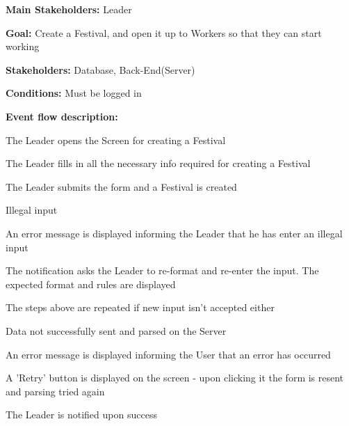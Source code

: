 				\noindent {}
				\begin{packed_item}
					\item \textbf{Main Stakeholders:} Leader
					\item \textbf{Goal:} Create a Festival, and open it up to Workers so that they can start working
					\item \textbf{Stakeholders:} Database, Back-End(Server)
					\item \textbf{Conditions:} Must be logged in
					\item \textbf{Event flow description: }
					\begin{packed_enum}
						\item The Leader opens the Screen for creating a Festival
						\item The Leader fills in all the necessary info required for creating a Festival
						\item The Leader submits the form and a Festival is created
					\end{packed_enum}
					
					\begin{packed_item}
						\item[2.a] Illegal input
						\item[] \begin{packed_enum}
							\item An error message is displayed informing the Leader that he has enter an illegal input
							\item The notification asks the Leader to re-format and re-enter the input. The expected format and rules are displayed
							\item The steps above are repeated if new input isn't accepted either
						\end{packed_enum}
						
						\item[3.a] Data not successfully sent and parsed on the Server
						\item[] \begin{packed_enum}
							\item An error message is displayed informing the User that an error has occurred
							\item A 'Retry' button is displayed on the screen - upon clicking it the form is resent and parsing tried again
							\item The Leader is notified upon success
						\end{packed_enum}
					
					\end{packed_item}
				\end{packed_item}
					

